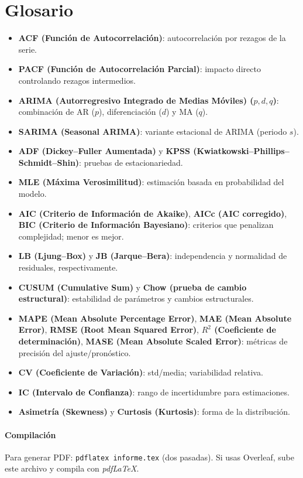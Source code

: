 \documentclass[11pt,a4paper]{article}
\begin{document}
\section*{Glosario}
\begin{itemize}
  \item \textbf{ACF (Función de Autocorrelación)}: autocorrelación por rezagos de la serie.
  \item \textbf{PACF (Función de Autocorrelación Parcial)}: impacto directo controlando rezagos intermedios.
  \item \textbf{ARIMA (Autorregresivo Integrado de Medias Móviles) (\(p,d,q\))}: combinación de AR (\(p\)), diferenciación (\(d\)) y MA (\(q\)).
  \item \textbf{SARIMA (Seasonal ARIMA)}: variante estacional de ARIMA (periodo \(s\)).
  \item \textbf{ADF (Dickey--Fuller Aumentada)} y \textbf{KPSS (Kwiatkowski--Phillips--Schmidt--Shin)}: pruebas de estacionariedad.
  \item \textbf{MLE (Máxima Verosimilitud)}: estimación basada en probabilidad del modelo.
  \item \textbf{AIC (Criterio de Información de Akaike)}, \textbf{AICc (AIC corregido)}, \textbf{BIC (Criterio de Información Bayesiano)}: criterios que penalizan complejidad; menor es mejor.
  \item \textbf{LB (Ljung--Box)} y \textbf{JB (Jarque--Bera)}: independencia y normalidad de residuales, respectivamente.
  \item \textbf{CUSUM (Cumulative Sum)} y \textbf{Chow (prueba de cambio estructural)}: estabilidad de parámetros y cambios estructurales.
  \item \textbf{MAPE (Mean Absolute Percentage Error)}, \textbf{MAE (Mean Absolute Error)}, \textbf{RMSE (Root Mean Squared Error)}, \textbf{$R^2$ (Coeficiente de determinación)}, \textbf{MASE (Mean Absolute Scaled Error)}: métricas de precisión del ajuste/pronóstico.
  \item \textbf{CV (Coeficiente de Variación)}: std/media; variabilidad relativa.
  \item \textbf{IC (Intervalo de Confianza)}: rango de incertidumbre para estimaciones.
  \item \textbf{Asimetría (Skewness)} y \textbf{Curtosis (Kurtosis)}: forma de la distribución.
\end{itemize}

\paragraph{Compilación} Para generar PDF: \texttt{pdflatex informe.tex} (dos pasadas). Si usas Overleaf, sube este archivo y compila con \textit{pdfLaTeX}.
\end{document}
